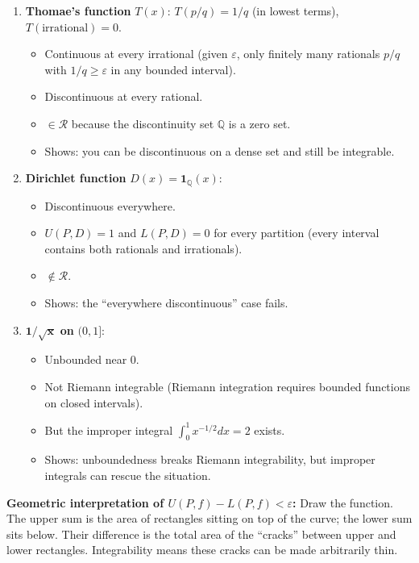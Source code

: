 \documentclass[11pt]{article}
\newcommand{\Q}{\mathbb{Q}}
\newcommand{\eps}{\varepsilon}
\theoremstyle{definition}
\begin{document}
\begin{enumerate}
\item \textbf{Thomae's function} $T(x)$: $T(p/q) = 1/q$ (in lowest terms), $T(\text{irrational}) = 0$.
\begin{itemize}
\item Continuous at every irrational (given $\eps$, only finitely many rationals $p/q$ with $1/q \geq \eps$ in any bounded interval).
\item Discontinuous at every rational.
\item $\in \mathscr{R}$ because the discontinuity set $\Q$ is a zero set.
\item Shows: you can be discontinuous on a dense set and still be integrable.
\end{itemize}

\item \textbf{Dirichlet function} $D(x) = \mathbf{1}_\Q(x)$:
\begin{itemize}
\item Discontinuous everywhere.
\item $U(P, D) = 1$ and $L(P, D) = 0$ for every partition (every interval contains both rationals and irrationals).
\item $\notin \mathscr{R}$.
\item Shows: the ``everywhere discontinuous'' case fails.
\end{itemize}

\item $\mathbf{1/\sqrt{x}}$ \textbf{on} $(0, 1]$:
\begin{itemize}
\item Unbounded near $0$.
\item Not Riemann integrable (Riemann integration requires bounded functions on closed intervals).
\item But the improper integral $\int_0^1 x^{-1/2} dx = 2$ exists.
\item Shows: unboundedness breaks Riemann integrability, but improper integrals can rescue the situation.
\end{itemize}
\end{enumerate}

\begin{application}
\textbf{Geometric interpretation of $U(P,f) - L(P,f) < \eps$:} Draw the function. The upper sum is the area of rectangles sitting on top of the curve; the lower sum sits below. Their difference is the total area of the ``cracks'' between upper and lower rectangles. Integrability means these cracks can be made arbitrarily thin.
\end{application}
\end{document}
